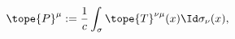\begin{equation}	\label{4.6}
\tope{P}^\mu
:=
\frac{1}{c} \int_{\sigma} \tope{T}^{\nu\mu}(x) \Id\sigma_\nu(x) ,
	\end{equation}

